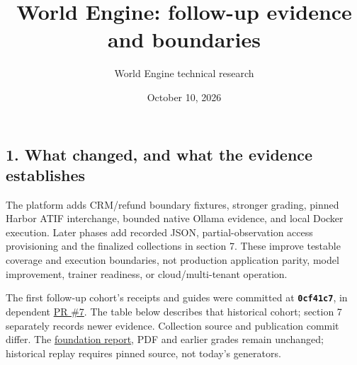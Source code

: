 \documentclass[
  11pt,
  letterpaper,
]{article}
\title{World Engine: follow-up evidence and boundaries}
\author{World Engine technical research}
\date{October 10, 2026}
\begin{document}
\maketitle

\subsection{1. What changed, and what the evidence
establishes}\label{what-changed-and-what-the-evidence-establishes}

The platform adds CRM/refund boundary fixtures, stronger grading, pinned
Harbor ATIF interchange, bounded native Ollama evidence, and local
Docker execution. Later phases add recorded JSON, partial-observation
access provisioning and the finalized collections in section 7. These
improve testable coverage and execution boundaries, not production
application parity, model improvement, trainer readiness, or
cloud/multi-tenant operation.

The first follow-up cohort's receipts and guides were committed at
\textbf{\texttt{0cf41c7}}, in dependent
\href{https://github.com/nthpaul/world-engine/pull/7}{PR \#7}. The table
below describes that historical cohort; section 7 separately records
newer evidence. Collection source and publication commit differ. The
\href{world-engine-report.md}{foundation report}, PDF and earlier grades
remain unchanged; historical replay requires pinned source, not today's
generators.
\end{document}

